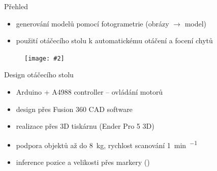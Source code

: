 \documentclass[czech]{beamer}
\makeatletter
\newcommand{\fitimage}[2][\@nil]{
	\begin{figure}
		\begin{adjustbox}{width=0.9\textwidth, totalheight=\textheight-2\baselineskip-2\baselineskip,keepaspectratio}
			\texttt{[image: \#2]}
		\end{adjustbox}
		\def\tmp{#1}%
	 \ifx\tmp\@nnil
			\else
			\caption*{#1}
		\fi
	\end{figure}
}
\makeatother
\begin{document}
	\begin{frame}{Přehled}
		\begin{itemize}
			\item generování modelů pomocí fotogrametrie (obrázy $\rightarrow$ model)
			\item použití otáčecího stolu k automatickému otáčení a focení chytů
		\end{itemize}

		\fitimage{images/setup.jpg}
	\end{frame}

	\begin{frame}{Design otáčecího stolu}
		\begin{itemize}
			\item Arduino + A4988 controller -- ovládání motorů
			\item design přes Fusion 360 CAD software
			\item realizace přes 3D tiskárnu (Ender Pro 5 3D)
			\item podpora objektů až do \SI{8}{\kilo\gram}, rychlost scanování \SI{1}{\minute\per\hold}
			\item inference pozice a velikosti přes markery (\raisebox{-0.29em}{})
		\end{itemize}


\end{frame}
\end{document}
